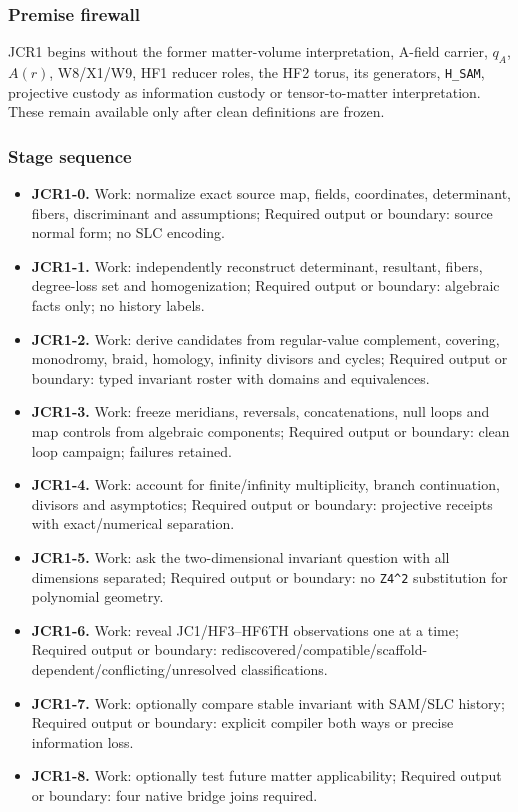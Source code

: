 \subsubsection{Premise firewall}\label{viii-ch11-premise-firewall}

JCR1 begins without the former matter-volume interpretation, A-field
carrier, \(q_A\), \(A(r)\), W8/X1/W9, HF1 reducer roles, the HF2 torus,
its generators, \texttt{H\_SAM}, projective custody as information
custody or tensor-to-matter interpretation. These remain available only
after clean definitions are frozen.

\subsubsection{Stage sequence}\label{viii-ch11-stage-sequence}

\begin{itemize}
\tightlist
\item
  \textbf{JCR1-0.} Work: normalize exact source map, fields,
  coordinates, determinant, fibers, discriminant and assumptions;
  Required output or boundary: source normal form; no SLC encoding.
\item
  \textbf{JCR1-1.} Work: independently reconstruct determinant,
  resultant, fibers, degree-loss set and homogenization; Required output
  or boundary: algebraic facts only; no history labels.
\item
  \textbf{JCR1-2.} Work: derive candidates from regular-value
  complement, covering, monodromy, braid, homology, infinity divisors
  and cycles; Required output or boundary: typed invariant roster with
  domains and equivalences.
\item
  \textbf{JCR1-3.} Work: freeze meridians, reversals, concatenations,
  null loops and map controls from algebraic components; Required output
  or boundary: clean loop campaign; failures retained.
\item
  \textbf{JCR1-4.} Work: account for finite/infinity multiplicity,
  branch continuation, divisors and asymptotics; Required output or
  boundary: projective receipts with exact/numerical separation.
\item
  \textbf{JCR1-5.} Work: ask the two-dimensional invariant question with
  all dimensions separated; Required output or boundary: no
  \texttt{Z4\^{}2} substitution for polynomial geometry.
\item
  \textbf{JCR1-6.} Work: reveal JC1/HF3--HF6TH observations one at a
  time; Required output or boundary:
  rediscovered/compatible/scaffold-dependent/conflicting/unresolved
  classifications.
\item
  \textbf{JCR1-7.} Work: optionally compare stable invariant with
  SAM/SLC history; Required output or boundary: explicit compiler both
  ways or precise information loss.
\item
  \textbf{JCR1-8.} Work: optionally test future matter applicability;
  Required output or boundary: four native bridge joins required.
\end{itemize}

